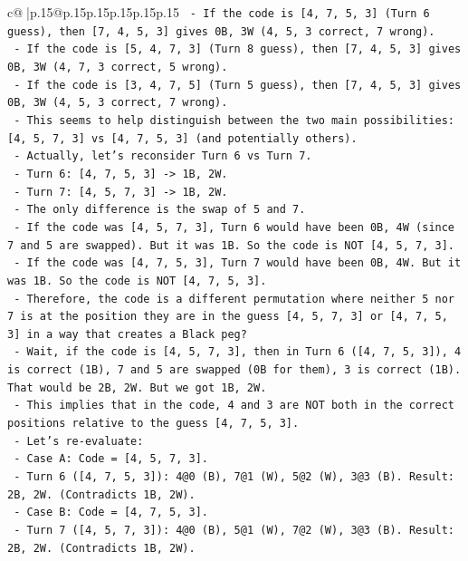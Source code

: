 \documentclass{article}
\begin{document}
{\begin{supertabular}{c@{$\;$}|p{.15\linewidth}@{}p{.15\linewidth}p{.15\linewidth}p{.15\linewidth}p{.15\linewidth}p{.15\linewidth}}
{{{\texttt{  {-} If the code is {[}4, 7, 5, 3{]} (Turn 6 guess), then {[}7, 4, 5, 3{]} gives 0B, 3W (4, 5, 3 correct, 7 wrong).} \\
\texttt{  {-} If the code is {[}5, 4, 7, 3{]} (Turn 8 guess), then {[}7, 4, 5, 3{]} gives 0B, 3W (4, 7, 3 correct, 5 wrong).} \\
\texttt{  {-} If the code is {[}3, 4, 7, 5{]} (Turn 5 guess), then {[}7, 4, 5, 3{]} gives 0B, 3W (4, 5, 3 correct, 7 wrong).} \\
\texttt{  {-} This seems to help distinguish between the two main possibilities: {[}4, 5, 7, 3{]} vs {[}4, 7, 5, 3{]} (and potentially others).} \\
\texttt{  {-} Actually, let's reconsider Turn 6 vs Turn 7.} \\
\texttt{    {-} Turn 6: {[}4, 7, 5, 3{]} {-}> 1B, 2W.} \\
\texttt{    {-} Turn 7: {[}4, 5, 7, 3{]} {-}> 1B, 2W.} \\
\texttt{    {-} The only difference is the swap of 5 and 7.} \\
\texttt{    {-} If the code was {[}4, 5, 7, 3{]}, Turn 6 would have been 0B, 4W (since 7 and 5 are swapped). But it was 1B. So the code is NOT {[}4, 5, 7, 3{]}.} \\
\texttt{    {-} If the code was {[}4, 7, 5, 3{]}, Turn 7 would have been 0B, 4W. But it was 1B. So the code is NOT {[}4, 7, 5, 3{]}.} \\
\texttt{    {-} Therefore, the code is a different permutation where neither 5 nor 7 is at the position they are in the guess {[}4, 5, 7, 3{]} or {[}4, 7, 5, 3{]} in a way that creates a Black peg?} \\
\texttt{    {-} Wait, if the code is {[}4, 5, 7, 3{]}, then in Turn 6 ({[}4, 7, 5, 3{]}), 4 is correct (1B), 7 and 5 are swapped (0B for them), 3 is correct (1B). That would be 2B, 2W. But we got 1B, 2W.} \\
\texttt{    {-} This implies that in the code, 4 and 3 are NOT both in the correct positions relative to the guess {[}4, 7, 5, 3{]}.} \\
\texttt{    {-} Let's re{-}evaluate:} \\
\texttt{      {-} Case A: Code = {[}4, 5, 7, 3{]}.} \\
\texttt{        {-} Turn 6 ({[}4, 7, 5, 3{]}): 4@0 (B), 7@1 (W), 5@2 (W), 3@3 (B). Result: 2B, 2W. (Contradicts 1B, 2W).} \\
\texttt{      {-} Case B: Code = {[}4, 7, 5, 3{]}.} \\
\texttt{        {-} Turn 7 ({[}4, 5, 7, 3{]}): 4@0 (B), 5@1 (W), 7@2 (W), 3@3 (B). Result: 2B, 2W. (Contradicts 1B, 2W).} \\
}}}
\end{supertabular}}
\end{document}
